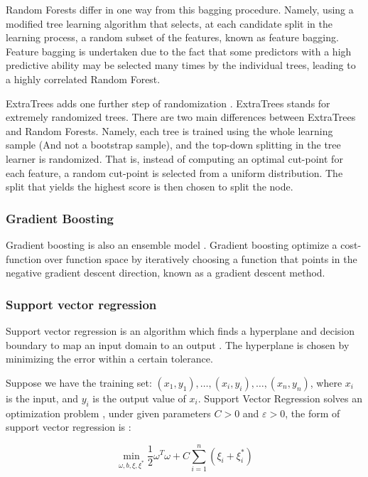 \documentclass[final,3p,times,twocolumn,numbers]{elsarticle}
\begin{document}
Random Forests differ in one way from this bagging procedure. Namely, using a modified tree learning algorithm that selects, at each candidate split in the learning process, a random subset of the features, known as feature bagging. Feature bagging is undertaken due to the fact that some predictors with a high predictive ability may be selected many times by the individual trees, leading to a highly correlated Random Forest.

ExtraTrees adds one further step of randomization \cite{Fike1988}. ExtraTrees stands for extremely randomized trees. There are two main differences between ExtraTrees and Random Forests. Namely, each tree is trained using the whole learning sample (And not a bootstrap sample), and the top-down splitting in the tree learner is randomized. That is, instead of computing an optimal cut-point for each feature, a random cut-point is selected from a uniform distribution. The split that yields the highest score is then chosen to split the node. 


\subsubsection{Gradient Boosting}

Gradient boosting is also an ensemble model \cite{316}. Gradient boosting optimize a cost-function over function space by iteratively choosing a function that points in the negative gradient descent direction, known as a gradient descent method.

\subsubsection{Support vector regression}

Support vector regression is an algorithm which finds a hyperplane and decision boundary to map an input domain to an output \cite{Cortes1995}. The hyperplane is chosen by minimizing the error within a certain tolerance.

Suppose we have the training set: $(x_1,y_1), \ldots,(x_i,y_i),\ldots,(x_n,y_n)$, where $x_i$ is the input, and $y_i$ is the output value of $x_i$. Support Vector Regression solves an optimization problem \cite{Shu2006,Chen2004}, under given parameters $C>0$ and $\varepsilon >0$, the form of support vector regression is \cite{Drucker1997}: 

\begin{equation}
\min_{\omega,b,\xi,\xi^{*}}\frac{1}{2}\omega^T\omega+C\sum_{i=1}^{n}(\xi_i+\xi_i^*)
\end{equation}
\end{document}
